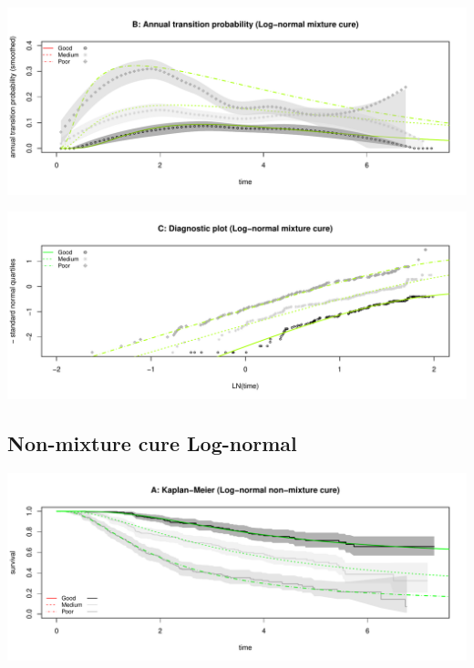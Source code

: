 \documentclass[]{article}
\begin{document}
\begin{flushleft}\includegraphics[height=0.25\textheight]{Images/cure_lnorm_mix-2} \end{flushleft}

\begin{flushleft}\includegraphics[height=0.25\textheight]{Images/cure_lnorm_mix-3} \end{flushleft}

\newpage

\subsection{Non-mixture cure
Log-normal}\label{non-mixture-cure-log-normal}

\begin{flushleft}\includegraphics[height=0.25\textheight]{Images/cure_lnorm_nmix-1} \end{flushleft}
\end{document}
